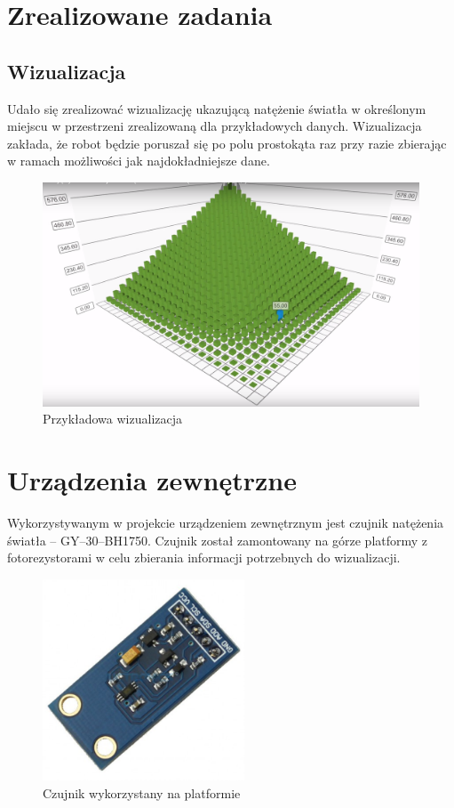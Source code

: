 \documentclass[10pt, a4paper]{article}
\begin{document}
\section{Zrealizowane zadania}
\subsection{Wizualizacja}
Udało się zrealizować wizualizację ukazującą natężenie światła w określonym miejscu w przestrzeni zrealizowaną dla przykładowych danych. Wizualizacja zakłada, że robot będzie poruszał się po polu prostokąta raz przy razie zbierając w ramach możliwości jak najdokładniejsze dane.
\begin{figure}[H]
\centering
\includegraphics[width=1\textwidth]{figures/wiz.png}
\caption{Przykładowa wizualizacja}
\end{figure}

\section{Urządzenia zewnętrzne}
Wykorzystywanym w projekcie urządzeniem zewnętrznym jest czujnik natężenia światła -- GY--30--BH1750. Czujnik został zamontowany na górze platformy z fotorezystorami w celu zbierania informacji potrzebnych do wizualizacji.
\begin{figure}[H]
\centering
\includegraphics[width=6cm]{figures/gy.png}
\caption{Czujnik wykorzystany na platformie}
\end{figure}
\end{document}
